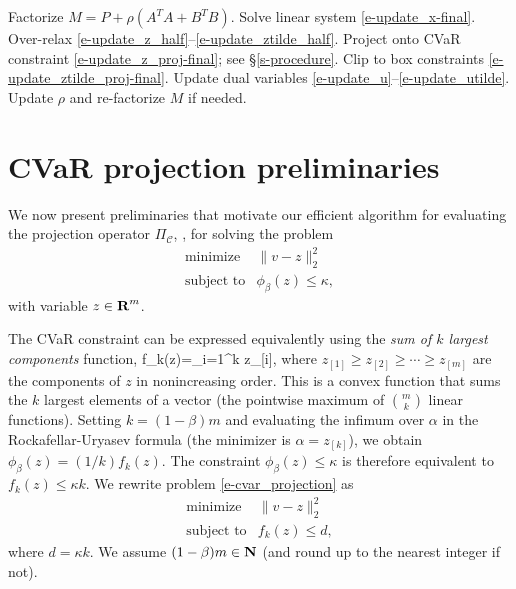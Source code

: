\documentclass[12pt]{article}
\begin{document}
\begin{algorithm}[h]
\caption{CVQP solver}\label{a-cvqp}
\begin{algorithmic}[1]
\State Factorize $M = P + \rho(A^TA + B^TB)$.
\Repeat
    \State Solve linear system \eqref{e-update_x-final}.
    \State Over-relax \eqref{e-update_z_half}--\eqref{e-update_ztilde_half}.
    \State Project onto CVaR constraint \eqref{e-update_z_proj-final}; see \S\ref{s-procedure}.
    \State Clip to box constraints \eqref{e-update_ztilde_proj-final}.
    \State Update dual variables \eqref{e-update_u}--\eqref{e-update_utilde}.
    \State Update $\rho$ and re-factorize $M$ if needed.
\end{algorithmic}
\end{algorithm}

\section{CVaR projection preliminaries} \label{s-cvar_projection}
We now present preliminaries that motivate our
efficient algorithm for evaluating the projection operator $\Pi_\mathcal{C}$, \ie, 
for solving the problem
\begin{equation} \label{e-cvar_projection}
\begin{array}{ll}
\mbox{minimize} & \|v - z\|_2^2 \\
\mbox{subject to} & \phi_\beta(z) \leq \kappa,
\end{array}
\end{equation}
with variable $z \in {\mbox{\bf R}}^m$.

The CVaR constraint can be expressed equivalently using the \textit{sum of $k$
largest components}
function, 
\BEQ\label{e-sumkproj}
  f_k(z)=\sum_{i=1}^k z_{[i]}, 
\EEQ
where $z_{[1]}\geq z_{[2]}\geq \cdots \geq z_{[m]}$ are the components of $z$ in 
nonincreasing order. This is a convex function that sums the $k$ largest elements of a vector
(the pointwise maximum of $\binom{m}{k}$ linear functions).
Setting $k = (1-\beta)m$ and evaluating the infimum over $\alpha$ in the
Rockafellar-Uryasev formula (the minimizer is $\alpha = z_{[k]}$), we obtain
$\phi_\beta(z) = (1/k) f_k(z)$. The constraint $\phi_\beta(z) \leq \kappa$ is
therefore equivalent to $f_k(z) \leq \kappa k$.
We rewrite problem \eqref{e-cvar_projection} as
\begin{equation} \label{e-sumklargest_projection}
\begin{array}{ll}
\mbox{minimize} & \|v - z\|_2^2 \\
\mbox{subject to} & f_k(z) \leq d,
\end{array}
\end{equation}
where $d = \kappa k$. We assume $(1-\beta) m\in{\mbox{\bf N}}$
(and round up to the nearest integer if not).
\end{document}
